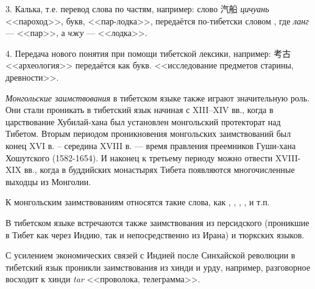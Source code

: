 3. Калька, т.е. перевод слова по частям, например: слово {\chinfont 汽船} \textit{цичуань} <<пароход>>, букв, <<пар-лодка>>, передаётся по-тибетски словом , где \textit{ланг} --- <<пар>>, а \textit{чжу} --- <<лодка>>.

4. Передача нового понятия при помощи тибетской лексики, например: {\chinfont 考古}  <<археология>> передаётся как  букв. <<исследование предметов старины, древности>>.

\emph{Монгольские заимствования} в тибетском языке также играют значительную роль. Они стали проникать в тибетский язык начиная с XIII--XIV вв., когда в царствование Хубилай-хана был установлен монгольский протекторат над Тибетом. Вторым периодом проникновения монгольских заимствований был конец XVI в. -- середина XVIII в. --- время правления преемников Гуши-хана Хошутского (1582-1654). И наконец к третьему периоду можно отвести XVIII-XIX вв., когда в буддийских монастырях Тибета появляются многочисленные выходцы из Монголии.

К монгольским заимствованиям относятся такие слова, как	, , , ,  и т.п.

В тибетском языке встречаются также заимствования из персидского (проникшие в Тибет как через Индию, так и непосредственно из Ирана) и тюркских языков.

С усилением экономических связей с Индией после Синхайской революции в тибетский язык проникли заимствования из хинди и урду, например, разговорное  восходит к хинди \textit{tar} <<проволока, телеграмма>>.
